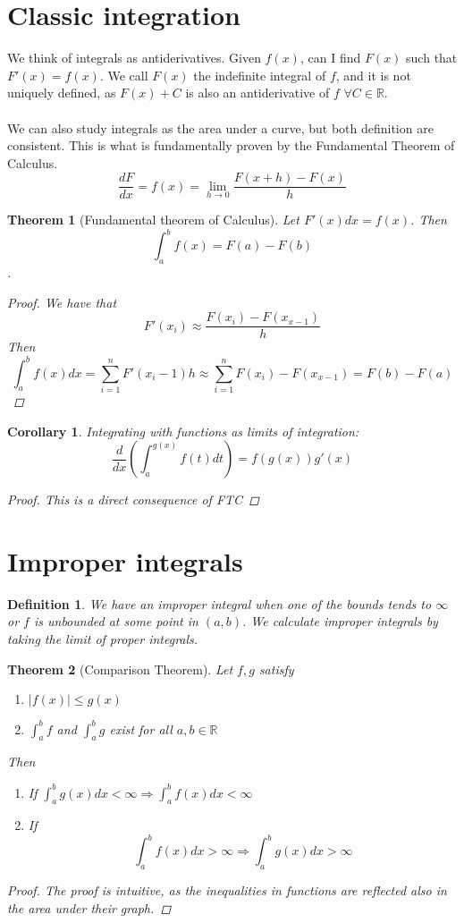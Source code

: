 \documentclass{book}
\newtheorem{theorem}{Theorem}[section]
\newtheorem{corollary}{Corollary}[theorem]
\newtheorem{definition}{Definition}[section]
\newcommand{\R}{\mathbb{R}}
\begin{document}
\section{Classic integration}
We think of integrals as antiderivatives. Given $f(x)$, can I find $F(x)$ such that $F'(x)=f(x)$. We call $F(x)$ the indefinite integral of $f$, and it is not uniquely defined, as $F(x)+C$ is also an antiderivative of $f$ $\forall C\in\mathbb{R}$.
\paragraph{} We can also study integrals as the area under a curve, but both definition are consistent. This is what is fundamentally proven by the Fundamental Theorem of Calculus. $$\frac{dF}{dx}=f(x)=\lim_{h\rightarrow 0}\frac{F(x+h)-F(x)}{h}$$

\begin{theorem}
[Fundamental theorem of Calculus]Let $F'(x)dx=f(x)$. Then $$\int_a^bf(x)=F(a)-F(b)$$. \begin{proof} We have that $$F'(x_i)\approx \frac{F(x_i)-F(x_{x-1})}{h}$$
Then $$\int_a^bf(x)dx=\sum_{i=1}^n F'(x_i-1)h\approx\sum_{i=1}^nF(x_i)-F(x_{x-1})=F(b)-F(a)$$
\end{proof}
\end{theorem}
\begin{corollary} Integrating with functions as limits of integration:
$$\frac{d}{dx}\left(\int_a^{g(x)}f(t)dt\right)=f(g(x))g'(x)$$
\begin{proof}
This is a direct consequence of FTC
\end{proof}
\end{corollary}

\section{Improper integrals}
\begin{definition}
We have an improper integral when one of the bounds tends to $\infty$ or $f$ is unbounded at some point in $(a,b)$. We calculate improper integrals by taking the limit of proper integrals. 
\end{definition}
\begin{theorem}
[Comparison Theorem]
Let $f,g$ satisfy \begin{enumerate}[label=\textit{\roman*)}]
    \item $\vert f(x)\vert \leq g(x)$
    \item $\int_a^bf$ and $\int_a^bg$ exist for all $a,b\in\R$
\end{enumerate}
Then \begin{enumerate}
    \item If $\int_a^bg(x)dx<\infty\Longrightarrow\int_a^bf(x)dx<\infty$
    \item If $$\int_a^bf(x)dx>\infty\Longrightarrow\int_a^bg(x)dx>\infty$$
    \end{enumerate}
    \begin{proof} The proof is intuitive, as the inequalities in functions are reflected also in the area under their graph.
    \end{proof}
\end{theorem}
\end{document}
